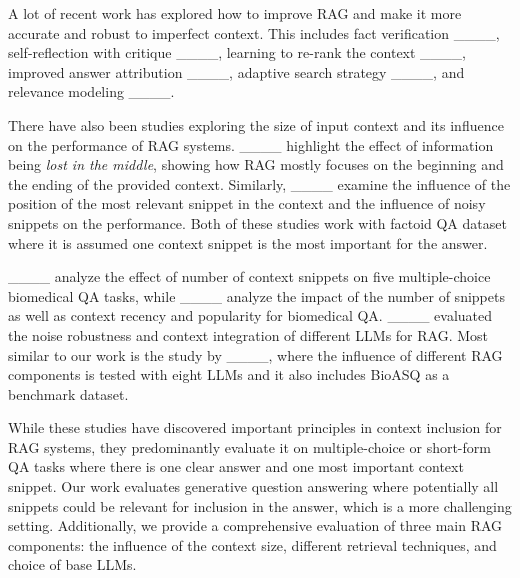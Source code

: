 
A lot of recent work has explored how to improve RAG and make it more accurate and robust to imperfect context. This includes fact verification ____, self-reflection with critique ____, learning to re-rank the context ____, improved answer attribution ____, adaptive search strategy ____, and relevance modeling ____. 

There have also been studies exploring the size of input context and its influence on the performance of RAG systems. ____ highlight the effect of information being \textit{lost in the middle}, showing how RAG mostly focuses on the beginning and the ending of the provided context. Similarly, ____ examine the influence of the position of the most relevant snippet in the context and the influence of noisy snippets on the performance. Both of these studies work with factoid QA dataset where it is assumed one context snippet is the most important for the answer.

____ analyze the effect of number of context snippets on five multiple-choice biomedical QA tasks, while ____ analyze the impact of the number of snippets as well as context recency and popularity for biomedical QA. ____ evaluated the noise robustness and context integration of different LLMs for RAG. Most similar to our work is the study by ____, where the influence of different RAG components is tested with eight LLMs and it also includes BioASQ as a benchmark dataset.

While these studies have discovered important principles in context inclusion for RAG systems, they predominantly evaluate it on multiple-choice or short-form QA tasks where there is one clear answer and one most important context snippet. Our work evaluates generative question answering where potentially all snippets could be relevant for inclusion in the answer, which is a more challenging setting. Additionally, we provide a comprehensive evaluation of three main RAG components: the influence of the context size, different retrieval techniques, and choice of base LLMs.

